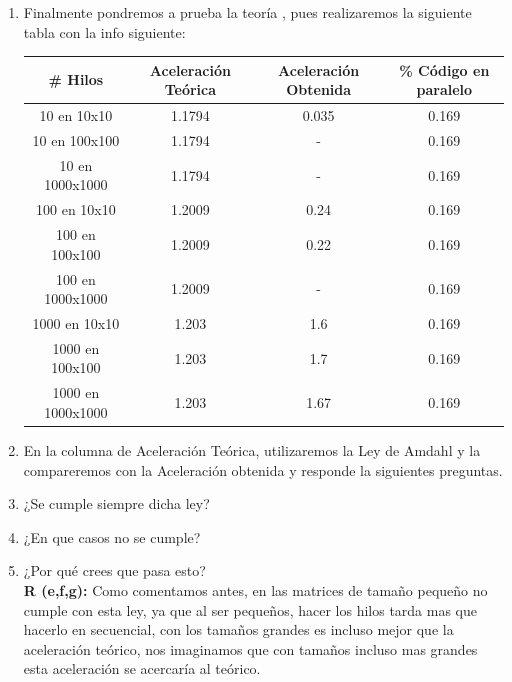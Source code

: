 \documentclass[12pt]{extarticle} %
\begin{document}
\begin{enumerate}
\begin{enumerate}
        \item Finalmente pondremos a prueba la teoría , pues realizaremos la siguiente tabla con la info siguiente: 
        \begin{table}[h]
            \centering
            \begin{tabular}{ |c|c|c|c| }
                \hline
                 \# Hilos & Aceleración Teórica & Aceleración Obtenida & \% Código en paralelo \\       
                 \hline
                 10 en 10x10 & 1.1794 & 0.035 & 0.169 \\
                 \hline
                 10 en 100x100 & 1.1794 & - & 0.169 \\
                 \hline
                 10 en 1000x1000 & 1.1794 & - & 0.169 \\
                 \hline
                 100 en 10x10 & 1.2009 & 0.24 & 0.169 \\
                 \hline
                 100 en 100x100 & 1.2009 & 0.22 & 0.169 \\
                 \hline
                 100 en 1000x1000 & 1.2009 & - & 0.169 \\
                 \hline
                 1000 en 10x10 & 1.203 & 1.6 & 0.169 \\
                 \hline
                 1000 en 100x100 & 1.203 & 1.7 & 0.169 \\
                 \hline
                 1000 en 1000x1000 & 1.203 & 1.67 & 0.169 \\
                 \hline
            \end{tabular}            
        \end{table}                
        \item En la columna de Aceleración Teórica, utilizaremos la Ley de Amdahl y la compareremos con la Aceleración obtenida y responde la siguientes preguntas.
        \item ¿Se cumple siempre dicha ley?      
        \item ¿En que casos no se cumple?
        \item ¿Por qué crees que pasa esto? \\[2mm]
        \textbf{R (e,f,g):} Como comentamos antes, en las matrices de tamaño pequeño no cumple con esta ley, ya que al ser pequeños, hacer los hilos tarda mas que hacerlo en secuencial, con los tamaños grandes es incluso mejor que la aceleración teórico, nos imaginamos que con tamaños incluso mas grandes esta aceleración se acercaría al teórico. 

\end{enumerate}
\end{enumerate}
\end{document}
